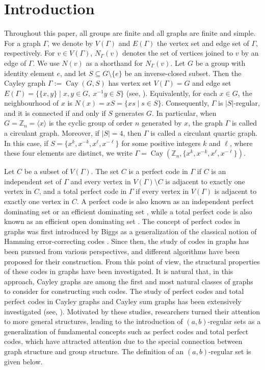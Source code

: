 \documentclass[12pt]{article}
\begin{document}
\section{Introduction}

\quad Throughout this paper, all groups are finite and all graphs are finite and simple. For a graph $\Gamma$, we denote by $V(\Gamma)$ and $E(\Gamma)$ the vertex set and edge set of $\Gamma$, respectively. For $v\in V(\Gamma)$, $N_\Gamma(v)$ denotes the set of vertices joined to $v$ by an edge of $\Gamma$. We use $N(v)$ as a shorthand for $N_\Gamma(v)$. Let $G$ be a group with identity element $e$, and let $S\subseteq G\setminus\{e\}$ be an inverse-closed subset. Then the Cayley graph $\Gamma:=\operatorname{Cay}(G,S)$ has vertex set $V(\Gamma)=G$ and edge set
$E(\Gamma)=\{\{x,y\}\mid x,y\in G,\ x^{-1}y\in S\}$ (see, \cite{BiggsAGT}).
Equivalently, for each $x\in G$, the neighbourhood of $x$ is $N(x)=xS=\{xs\mid s\in S\}$. Consequently, $\Gamma$ is $|S|$-regular, and it is connected if and only if $S$ generates $G$. In particular, when $G=\mathbb{Z}_n=\langle x\rangle$ is the cyclic group of order $n$ generated by $x$, the graph $\Gamma$ is called a circulant graph. Moreover, if $|S|=4$, then $\Gamma$ is called a circulant quartic graph. In this case, if $S=\{x^k,x^{-k},x^\ell,x^{-\ell}\}$ for some positive integers $k$ and $ \ell$, where these four elements are distinct, we write $\Gamma=\operatorname{Cay}(\mathbb{Z}_n,\{x^k,x^{-k},x^\ell,x^{-\ell}\})$.

Let $C$ be a subset of $V(\Gamma)$. The set $C$ is a perfect code in $\Gamma$ if $C$ is an independent set of $\Gamma$ and every vertex in $V(\Gamma)\setminus C$ is adjacent to exactly one vertex in $C$, and a total perfect code in $\Gamma$ if every vertex in $V(\Gamma)$ is adjacent to exactly one vertex in $C$. A perfect code is also known as an independent perfect dominating set \cite{Lee} or an efficient dominating set \cite{DS}, while a total perfect code is also known as an efficient open dominating set \cite{GSS,HHS}. The concept of perfect codes in graphs was first introduced by Biggs as a generalization of the classical notion of Hamming error-correcting codes \cite{Biggs}. Since then, the study of codes in graphs has been pursued from various perspectives, and different algorithms have been proposed for their construction. From this point of view, the structural properties of these codes in graphs have been investigated. It is natural that, in this approach, Cayley graphs are among the first and most natural classes of graphs to consider for constructing such codes. The study of perfect codes and total perfect codes in Cayley graphs and Cayley sum graphs has been extensively investigated (see, \cite{AAR,CYS,CWX,HXS,LLL,MFW,MWWZ,WWSZ,Zhang,Zhou}). Motivated by these studies, researchers turned their attention to more general structures, leading to the introduction of $(a,b)$-regular sets as a generalization of fundamental concepts such as perfect codes and total perfect codes, which have attracted attention due to the special connection between graph structure and group structure. The definition of an $(a,b)$-regular set is given below.
\end{document}
